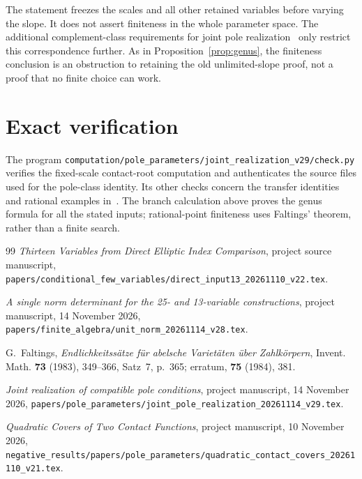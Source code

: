 \documentclass[11pt,a4paper]{article}
\theoremstyle{definition}\newtheorem{definition}[theorem]{Definition}
\theoremstyle{remark}\newtheorem{remark}[theorem]{Remark}
\begin{document}
The statement freezes the scales and all other retained variables
before varying the slope. It does not assert finiteness in the whole
parameter space. The additional complement-class requirements for joint pole
realization~\cite{JointRealization} only restrict this correspondence further.
As in Proposition~\ref{prop:genus}, the finiteness conclusion is an
obstruction to retaining the old unlimited-slope proof, not a proof
that no finite choice can work.


\section{Exact verification}
The program
\nolinkurl{computation/pole_parameters/joint_realization_v29/check.py}
verifies the fixed-scale contact-root computation and authenticates
the source files used for the pole-class identity. Its other checks
concern the transfer identities and rational examples
in~\cite{JointRealization}. The branch calculation above proves the
genus formula for all the stated inputs; rational-point finiteness
uses Faltings' theorem, rather than a finite search.

\begin{thebibliography}{99}
 \emph{Thirteen Variables from Direct Elliptic Index Comparison},
project source manuscript,
\nolinkurl{papers/conditional_few_variables/direct_input13_20261110_v22.tex}.

 \emph{A single norm determinant for the 25- and 13-variable constructions},
project manuscript, 14 November 2026,
\nolinkurl{papers/finite_algebra/unit_norm_20261114_v28.tex}.

 G.~Faltings, \emph{Endlichkeitss\"atze f\"ur abelsche
Variet\"aten \"uber Zahlk\"orpern}, Invent. Math. \textbf{73} (1983),
349--366, Satz~7, p.~365; erratum, \textbf{75} (1984), 381.

\emph{Joint realization of compatible pole conditions},
project manuscript, 14 November 2026,
\nolinkurl{papers/pole_parameters/joint_pole_realization_20261114_v29.tex}.

\emph{Quadratic Covers of Two Contact Functions},
project manuscript, 10 November 2026,
\nolinkurl{negative_results/papers/pole_parameters/quadratic_contact_covers_20261110_v21.tex}.
\end{thebibliography}
\end{document}
